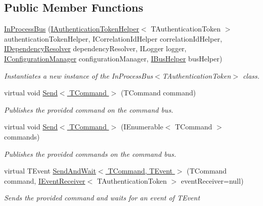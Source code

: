 \subsection*{Public Member Functions}
\begin{DoxyCompactItemize}
\item 
\hyperlink{classCqrs_1_1Bus_1_1InProcessBus_a64bea583461562783d97cd98ff0dff91_a64bea583461562783d97cd98ff0dff91}{In\+Process\+Bus} (\hyperlink{interfaceCqrs_1_1Authentication_1_1IAuthenticationTokenHelper}{I\+Authentication\+Token\+Helper}$<$ T\+Authentication\+Token $>$ authentication\+Token\+Helper, I\+Correlation\+Id\+Helper correlation\+Id\+Helper, \hyperlink{interfaceCqrs_1_1Configuration_1_1IDependencyResolver}{I\+Dependency\+Resolver} dependency\+Resolver, I\+Logger logger, \hyperlink{interfaceCqrs_1_1Configuration_1_1IConfigurationManager}{I\+Configuration\+Manager} configuration\+Manager, \hyperlink{interfaceCqrs_1_1Bus_1_1IBusHelper}{I\+Bus\+Helper} bus\+Helper)
\begin{DoxyCompactList}\small\item\em Instantiates a new instance of the In\+Process\+Bus$<$\+T\+Authentication\+Token$>$ class. \end{DoxyCompactList}\item 
virtual void \hyperlink{classCqrs_1_1Bus_1_1InProcessBus_a6a074ef3663d2855875307b106fe4416_a6a074ef3663d2855875307b106fe4416}{Send$<$ T\+Command $>$} (T\+Command command)
\begin{DoxyCompactList}\small\item\em Publishes the provided {\itshape command}  on the command bus. \end{DoxyCompactList}\item 
virtual void \hyperlink{classCqrs_1_1Bus_1_1InProcessBus_ae5dae5f2445387280c974ec181167055_ae5dae5f2445387280c974ec181167055}{Send$<$ T\+Command $>$} (I\+Enumerable$<$ T\+Command $>$ commands)
\begin{DoxyCompactList}\small\item\em Publishes the provided {\itshape commands}  on the command bus. \end{DoxyCompactList}\item 
virtual T\+Event \hyperlink{classCqrs_1_1Bus_1_1InProcessBus_a506d617dc7ec3838791a91e09b73b8ce_a506d617dc7ec3838791a91e09b73b8ce}{Send\+And\+Wait$<$ T\+Command, T\+Event $>$} (T\+Command command, \hyperlink{interfaceCqrs_1_1Events_1_1IEventReceiver}{I\+Event\+Receiver}$<$ T\+Authentication\+Token $>$ event\+Receiver=null)
\begin{DoxyCompactList}\small\item\em Sends the provided {\itshape command}  and waits for an event of {\itshape T\+Event}  \end{DoxyCompactList}\item 

\end{DoxyCompactItemize}
